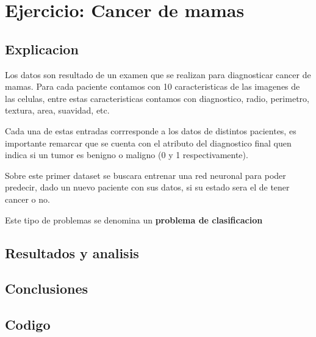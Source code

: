 \section{Ejercicio: Cancer de mamas}
\subsection{Explicacion}
Los datos son resultado de un examen que se realizan para diagnosticar cancer de mamas. Para cada paciente contamos con 10 caracteristicas de las imagenes de las celulas, entre estas caracteristicas contamos con diagnostico, radio, perimetro, textura, area, suavidad, etc. 

Cada una de estas entradas corrresponde a los datos de distintos pacientes, es importante remarcar que se cuenta con el atributo del diagnostico final quen indica si un tumor es benigno o maligno (0 y 1 respectivamente).

Sobre este primer dataset se buscara entrenar una red neuronal para poder predecir, dado un nuevo paciente con sus datos, si su estado sera el de tener cancer o no.

Este tipo de problemas se denomina un \textbf{problema de clasificacion}

\subsection{Resultados y analisis}
\subsection{Conclusiones}
\subsection{Codigo}